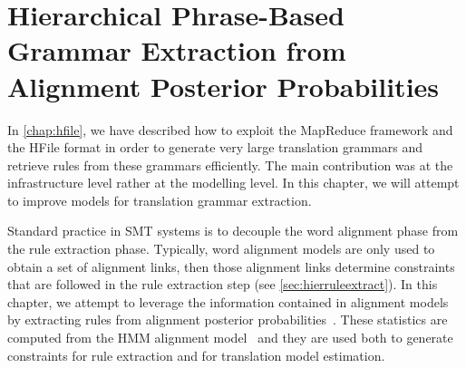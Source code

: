 \chapter{Hierarchical Phrase-Based Grammar Extraction from Alignment Posterior Probabilities}
\label{chap:extractionFromPosteriors}


In \autoref{chap:hfile}, we have described how to exploit the MapReduce
framework and the HFile format in order to generate very large
translation grammars
and retrieve rules from these grammars efficiently. The main contribution
was at the infrastructure level rather at the modelling level. In this chapter,
we will attempt to improve models for translation grammar extraction.

Standard practice in SMT systems is to decouple the word alignment phase from
the rule extraction phase. Typically, word alignment models are only used to
obtain a set of alignment links, then those alignment links determine
constraints that are followed in the rule extraction
step (see \autoref{sec:hierruleextract}). In
this chapter, we attempt to leverage the information
contained in alignment models by extracting rules from alignment posterior
probabilities~\citep{degispert-pino-byrne:2010:EMNLP}. These statistics are
computed from the HMM alignment model~\citep{vogel-ney-tillmann} and they
are used
both to generate constraints for rule extraction and for translation model
estimation.

